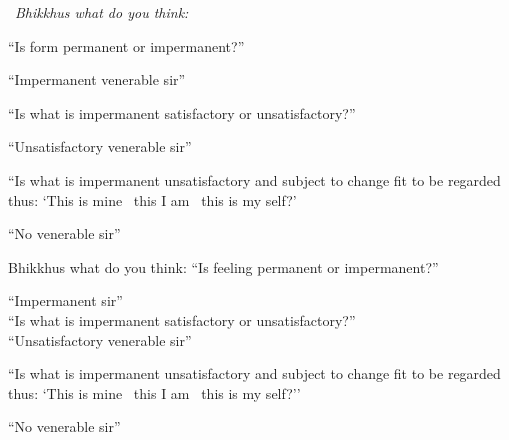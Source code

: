 \begin{english-only-leader}
  \anglebracketleft\ \hspace{-0.5mm}\textit{Bhikkhus what do you think:} \hspace{-0.5mm}\anglebracketright\
\end{english-only-leader}
  \begin{english-only-hangtogether}
    ``Is form permanent or impermanent?''
  \end{english-only-hangtogether}
  \begin{english-only-hangtogether}
  ``Impermanent venerable sir''
  \end{english-only-hangtogether}
  \begin{english-only-hangtogether}
  ``Is what is impermanent satisfactory or unsatisfactory?''
  \end{english-only-hangtogether}
  \begin{english-only-hangtogether}
  ``Unsatisfactory venerable sir''
  \end{english-only-hangtogether}
  \begin{english-only-hangtogether}
    ``Is what is impermanent unsatisfactory and subject to change fit to be regarded thus: `This is mine \breathmark\ this I am \breathmark\ this is my self?'
  \end{english-only-hangtogether}
  \begin{english-only-hangtogether}
  ``No venerable sir''
  \end{english-only-hangtogether}

\begin{english-only-nohang}
  \begin{english-only-hang}
    Bhikkhus what do you think: ``Is feeling permanent or impermanent?''
  \end{english-only-hang}
  ``Impermanent sir''\\
  ``Is what is impermanent satisfactory or unsatisfactory?''\\
  ``Unsatisfactory venerable sir''\\
  \begin{english-hangtogether}
    ``Is what is impermanent unsatisfactory and subject to change fit to be regarded thus: `This is mine \breathmark\ this I am \breathmark\ this is my self?''
  \end{english-hangtogether}
  ``No venerable sir''
\end{english-only-nohang}


